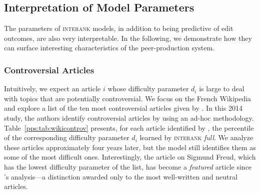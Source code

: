 \subsection{Interpretation of Model Parameters}

The parameters of \textsc{interank} models, in addition to being predictive of edit outcomes, are also very interpretable.
In the following, we demonstrate how they can surface interesting characteristics of the peer-production system.

\subsubsection{Controversial Articles}
Intuitively, we expect an article $i$ whose difficulty parameter $d_i$ is large to deal with topics that are potentially controversial.
We focus on the French Wikipedia and explore a list of the ten most controversial articles given by \citet{yasseri2014most}.
In this 2014 study, the authors identify controversial articles by using an ad-hoc methodology.
Table~\ref{pps:tab:wikicontrov} presents, for each article identified by \citeauthor{yasseri2014most}, the percentile of the corresponding difficulty parameter $d_i$ learned by \textsc{interank} \emph{full}.
We analyze these articles approximately four years later, but the model still identifies them as some of the most difficult ones.
Interestingly, the article on Sigmund Freud, which has the lowest difficulty parameter of the list, has become a \emph{featured} article since \citeauthor{yasseri2014most}'s analysis---a distinction awarded only to the most well-written and neutral articles.

